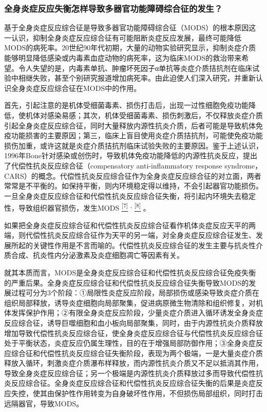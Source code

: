 \subsubsection{全身炎症反应失衡怎样导致多器官功能障碍综合征的发生？}

基于全身炎症反应综合征是导致多器官功能障碍综合征（MODS）的根本原因这一认识，抑制全身炎症反应综合征有可能阻断炎症反应发展，最终可能降低MODS的病死率。20世纪90年代初期，大量的动物实验研究显示，抑制炎症介质能够明显降低感染或内毒素血症动物的病死率，这为临床MODS的救治带来希望。令人失望的是，内毒素单抗、肿瘤坏死因子α单抗等炎症介质拮抗剂在临床试验中相继失败，甚至个别研究报道增加病死率。由此迫使人们深入研究，并重新认识全身炎症反应综合征在MODS中的作用。

首先，引起注意的是机体受细菌毒素、损伤打击后，出现一过性细胞免疫功能降低，使机体对感染易感；其次，机体受细菌毒素、损伤刺激后，不仅释放炎症介质引起全身炎症反应综合征，同时大量释放内源性抗炎介质，后者可能是导致机体免疫功能损害的主要原因；第三，临床上盲目使用炎症介质拮抗剂，可能使免疫功能损伤加重，或许这就是炎症介质拮抗剂临床试验失败的主要原因。鉴于上述认识，1996年Bone针对感染或创伤时，导致机体免疫功能降低的内源性抗炎反应，提出了代偿性抗炎反应综合征（compensatory
anti-inflammatory response
syndrome，CARS）的概念。代偿性抗炎反应综合征作为全身炎症反应综合征的对立面，两者常常是不平衡的。如保持平衡，则内环境稳定得以维持，不会引起器官功能损伤。一旦全身炎症反应综合征和代偿性抗炎反应综合征失衡，将引起内环境失去稳定性，导致组织器官损伤，发生MODS
\protect\hyperlink{text00007.htmlux5cux23ch7-6}{\textsuperscript{{[}7{]}}}
\textsuperscript{,}
\protect\hyperlink{text00007.htmlux5cux23ch8-6}{\textsuperscript{{[}8{]}}}
。

如果把全身炎症反应综合征和代偿性抗炎反应综合征看作机体炎症反应天平的两端，则代偿性抗炎反应综合征作为天平的另一端，对全身炎症反应综合征发生、发展所起的关键性作用是不言而喻的。代偿性抗炎反应综合征的发生主要与抗炎性介质合成、抗炎性内分泌激素及炎症细胞凋亡等因素有关。

就其本质而言，MODS是全身炎症反应综合征和代偿性抗炎反应综合征免疫失衡的严重后果。全身炎症反应综合征和代偿性抗炎反应综合征失衡导致MODS的发展过程可分为3个阶段：①局限性炎症反应阶段，局部损伤或感染导致炎症介质在组织局部释放，诱导炎症细胞向局部聚集，促进病原微生物清除和组织修复，对机体发挥保护作用；②有限全身炎症反应阶段，少量炎症介质进入循环诱发全身炎症反应综合征，诱导巨噬细胞和血小板向局部聚集，同时，由于内源性抗炎介质释放增加导致代偿性抗炎反应综合征，使全身炎症反应综合征与代偿性抗炎反应综合征处于平衡状态，炎症反应仍属生理性，目的在于增强局部防御作用；③全身炎症反应综合征和代偿性抗炎反应综合征失衡阶段，表现为两个极端，一是大量炎症介质释放入循环，刺激炎症介质瀑布样释放，而内源性抗炎介质又不足以抵消其作用，导致全身炎症反应综合征；另一个极端是内源性抗炎介质释放过多而导致代偿性抗炎反应综合征。全身炎症反应综合征和代偿性抗炎反应综合征失衡的后果是炎症反应失控，使其由保护性作用转变为自身破坏性作用，不但损伤局部组织，同时打击远隔器官，导致MODS。

